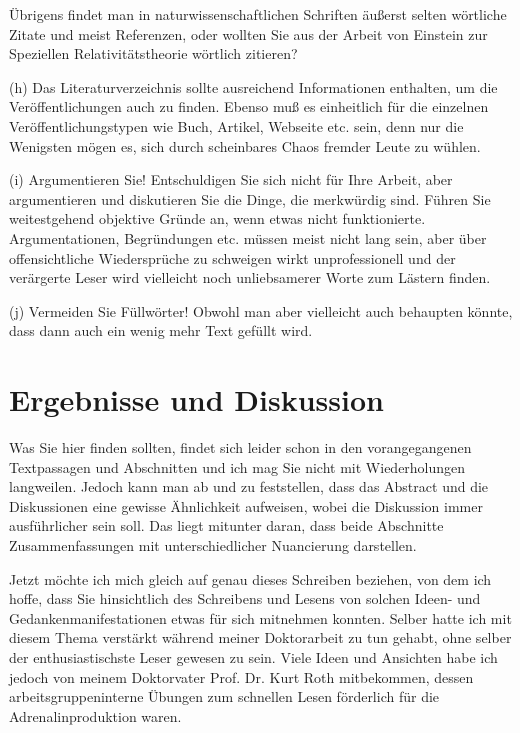 \documentclass[10pt,twocolumn]{scrartcl}
\begin{document}
\begin{list}{-}{}
Übrigens findet man in naturwissenschaftlichen Schriften 
äußerst selten wörtliche Zitate und meist Referenzen, oder wollten Sie
aus der Arbeit von Einstein zur Speziellen Relativitätstheorie \cite{Einstein1905}
wörtlich zitieren?
\item[(h)] Das Literaturverzeichnis sollte ausreichend Informationen enthalten,
um die Veröffentlichungen auch zu finden. Ebenso muß es einheitlich für
die einzelnen Veröffentlichungstypen wie Buch, Artikel, Webseite etc. sein,
denn nur die Wenigsten mögen es, sich durch scheinbares Chaos fremder Leute zu wühlen.
\item[(i)] Argumentieren Sie! Entschuldigen Sie sich nicht für Ihre Arbeit, 
aber argumentieren und diskutieren Sie die Dinge, die merkwürdig sind.
Führen Sie weitestgehend objektive Gründe an, wenn etwas nicht funktionierte.
Argumentationen, Begründungen etc. müssen meist nicht lang sein, 
aber über offensichtliche Wiedersprüche zu schweigen wirkt unprofessionell 
und der verärgerte Leser wird vielleicht noch unliebsamerer Worte 
zum Lästern finden.
\item[(j)] Vermeiden Sie Füllwörter! Obwohl man aber vielleicht auch behaupten
könnte, dass dann auch ein wenig mehr Text gefüllt wird.
\end{list}


\section*{Ergebnisse und Diskussion}

Was Sie hier finden sollten, findet sich leider schon in den vorangegangenen
Textpassagen und Abschnitten und ich mag Sie nicht mit Wiederholungen
langweilen. Jedoch kann man ab und zu feststellen, dass das Abstract und
die Diskussionen eine gewisse Ähnlichkeit aufweisen, wobei die Diskussion
immer ausführlicher sein soll. Das liegt mitunter daran, dass beide 
Abschnitte Zusammenfassungen mit unterschiedlicher Nuancierung darstellen. 

Jetzt möchte ich mich gleich auf genau dieses Schreiben beziehen, 
von dem ich hoffe, dass Sie hinsichtlich des Schreibens und Lesens 
von solchen Ideen- und Gedankenmanifestationen etwas für sich mitnehmen konnten. 
Selber hatte ich mit diesem Thema verstärkt während meiner Doktorarbeit \cite{Gerhards2008} 
zu tun gehabt, ohne selber der enthusiastischste Leser gewesen zu sein.
Viele Ideen und Ansichten habe ich jedoch von meinem Doktorvater 
Prof. Dr. Kurt Roth mitbekommen, dessen arbeitsgruppeninterne Übungen 
zum schnellen Lesen förderlich für die Adrenalinproduktion waren.
\end{document}
